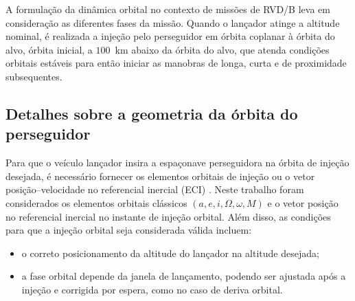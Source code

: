 
\label{sec_eq_mov_orbital_manobras}

A formulação da dinâmica orbital no contexto de missões de RVD/B leva em consideração as diferentes fases da missão.
Quando o lançador atinge a altitude nominal, é realizada a injeção pelo perseguidor em órbita coplanar à órbita do alvo, órbita inicial, a $100$~km abaixo da órbita do alvo, que atenda condições orbitais estáveis para então iniciar as manobras de longa, curta e de proximidade subsequentes.

\subsection{Detalhes sobre a geometria da órbita do perseguidor}

Para que o veículo lançador insira a espaçonave perseguidora na órbita de injeção desejada, é necessário fornecer os elementos orbitais \cite{vallado2007fundamentals} de injeção ou o vetor posição--velocidade no referencial inercial (ECI) .
Neste trabalho foram considerados os elementos orbitais clássicos $(a, e, i, \Omega, \omega, M)$ e o vetor posição no referencial inercial no instante de injeção orbital.
Além disso, as condições para que a injeção orbital seja considerada válida incluem:

\begin{itemize}
    \item o correto posicionamento da altitude do lançador na altitude desejada;
    \item a fase orbital depende da janela de lançamento, podendo ser ajustada após a injeção e corrigida por espera, como no caso de deriva orbital.
\end{itemize}